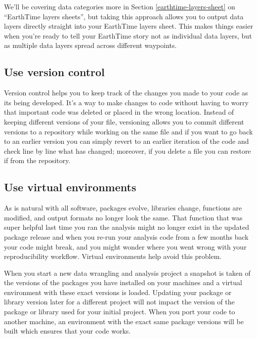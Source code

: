\documentclass[
]{book}
\begin{document}
We'll be covering data categories more in Section \ref{earthtime-layers-sheet} on ``EarthTime layers sheets'', but taking this approach allows you to output data layers directly straight into your EarthTime layers sheet. This makes things easier when you're ready to tell your EarthTime story not as individual data layers, but as multiple data layers spread across different waypoints.

\hypertarget{use-version-control}{%
\subsection*{Use version control}\label{use-version-control}}


Version control helps you to keep track of the changes you made to your code as its being developed. It's a way to make changes to code without having to worry that important code was deleted or placed in the wrong location. Instead of keeping different versions of your file, versioning allows you to commit different versions to a repository while working on the same file and if you want to go back to an earlier version you can simply revert to an earlier iteration of the code and check line by line what has changed; moreover, if you delete a file you can restore if from the repository.

\hypertarget{use-virtual-environments}{%
\subsection*{Use virtual environments}\label{use-virtual-environments}}


As is natural with all software, packages evolve, libraries change, functions are modified, and output formats no longer look the same. That function that was super helpful last time you ran the analysis might no longer exist in the updated package release and when you re-run your analysis code from a few months back your code might break, and you might wonder where you went wrong with your reproducibility workflow. Virtual environments help avoid this problem.

When you start a new data wrangling and analysis project a snapshot is taken of the versions of the packages you have installed on your machines and a virtual environment with these exact versions is loaded. Updating your package or library version later for a different project will not impact the version of the package or library used for your initial project. When you port your code to another machine, an environment with the exact same package versions will be built which ensures that your code works.
\end{document}
